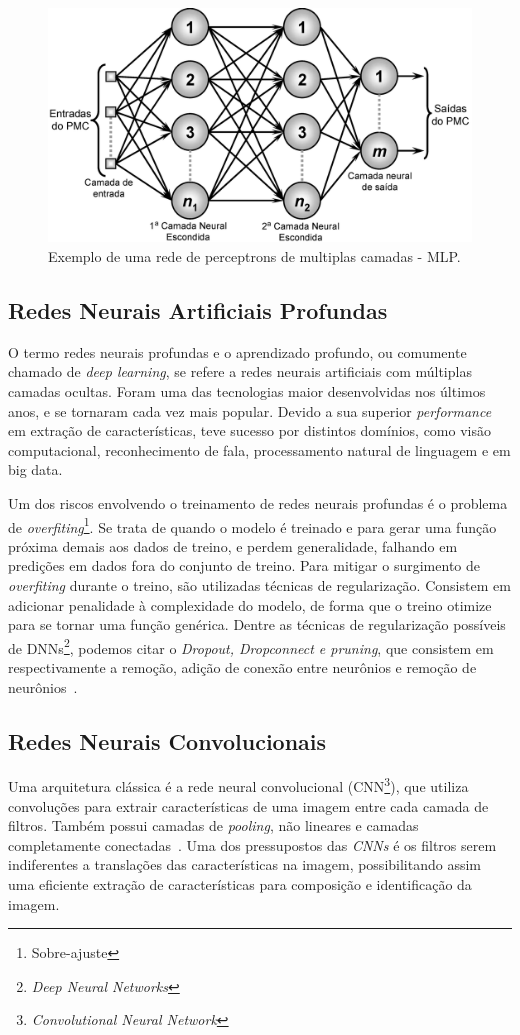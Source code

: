 \begin{figure}[!ht]
    \centering
    \includegraphics[width=0.6\columnwidth]{
        Imagens/RedeNeural.PNG
    }
    \caption{Exemplo de uma rede de perceptrons de multiplas camadas - MLP.}
    \label{fig:ann}
\end{figure}
\subsection{Redes Neurais Artificiais Profundas}\label{sec:Cap2_redes_neurais_profundas}
O termo redes neurais profundas e o aprendizado profundo, ou comumente chamado de \textit{deep learning}, se refere a redes neurais artificiais com múltiplas camadas ocultas. Foram uma das tecnologias maior desenvolvidas nos últimos anos, e se tornaram cada vez mais popular. Devido a sua superior \textit{performance} em extração de características, teve sucesso por distintos domínios, como visão computacional, reconhecimento de fala, processamento natural de linguagem e em big data.

Um dos riscos envolvendo o treinamento de redes neurais profundas é o problema de \textit{overfiting}\footnote{Sobre-ajuste}. Se trata de quando o modelo é treinado e para gerar uma função próxima demais aos dados de treino, e perdem generalidade, falhando em predições em dados fora do conjunto de treino. Para mitigar o surgimento de \textit{overfiting} durante o treino, são utilizadas técnicas de regularização. Consistem em adicionar penalidade à complexidade do modelo, de forma que o treino otimize para se tornar uma função genérica. Dentre as técnicas de regularização possíveis de DNNs\footnote{\textit{Deep Neural Networks}}, podemos citar o \textit{Dropout, Dropconnect e pruning}, que consistem em respectivamente a remoção, adição de conexão entre neurônios e remoção de neurônios~\cite{hastie01statisticallearning}.


\subsection{Redes Neurais Convolucionais}\label{sec:Cap2_redes_neurais_convolucionais}
Uma arquitetura clássica é a rede neural convolucional (CNN\footnote{\textit{Convolutional Neural Network}}), que utiliza convoluções para extrair características de uma imagem entre cada camada de filtros. Também possui camadas de \textit{pooling}, não lineares e camadas completamente conectadas~\cite{8308186}. Uma dos pressupostos das \textit{CNNs} é os filtros serem indiferentes a translações das características na imagem, possibilitando assim uma eficiente extração de características para composição e identificação da imagem.


